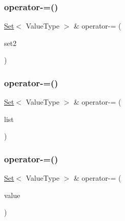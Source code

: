 \mbox{\label{classSet_a23e65f7b00322e3a8ae4d4b5c798d3fd}} 
\subsubsection{\texorpdfstring{operator-\/=()}{operator-=()}\hspace{0.1cm}{\footnotesize\ttfamily [1/3]}}
{\footnotesize\ttfamily \mbox{\hyperlink{classSet}{Set}}$<$ Value\+Type $>$ \& operator-\/= (\begin{DoxyParamCaption}\item[{const \mbox{\hyperlink{classSet}{Set}}$<$ Value\+Type $>$ \&}]{set2 }\end{DoxyParamCaption})}

\mbox{\label{classSet_ad727c12a9c6fe85b3435b4520d4565c9}} 
\subsubsection{\texorpdfstring{operator-\/=()}{operator-=()}\hspace{0.1cm}{\footnotesize\ttfamily [2/3]}}
{\footnotesize\ttfamily \mbox{\hyperlink{classSet}{Set}}$<$ Value\+Type $>$ \& operator-\/= (\begin{DoxyParamCaption}\item[{std\+::initializer\+\_\+list$<$ Value\+Type $>$}]{list }\end{DoxyParamCaption})}

\mbox{\label{classSet_a01918f11b3fb654a37f423af8c2574cc}} 
\subsubsection{\texorpdfstring{operator-\/=()}{operator-=()}\hspace{0.1cm}{\footnotesize\ttfamily [3/3]}}
{\footnotesize\ttfamily \mbox{\hyperlink{classSet}{Set}}$<$ Value\+Type $>$ \& operator-\/= (\begin{DoxyParamCaption}\item[{const Value\+Type \&}]{value }\end{DoxyParamCaption})}

